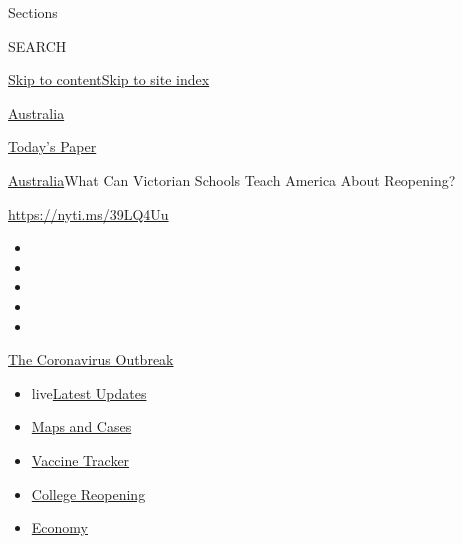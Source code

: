 Sections

SEARCH

\protect\hyperlink{site-content}{Skip to
content}\protect\hyperlink{site-index}{Skip to site index}

\href{https://www.nytimes.com/section/world/australia}{Australia}

\href{https://myaccount.nytimes.com/auth/login?response_type=cookie\&client_id=vi}{}

\href{https://www.nytimes.com/section/todayspaper}{Today's Paper}

\href{/section/world/australia}{Australia}\textbar{}What Can Victorian
Schools Teach America About Reopening?

\url{https://nyti.ms/39LQ4Uu}

\begin{itemize}
\item
\item
\item
\item
\item
\end{itemize}

\href{https://www.nytimes.com/news-event/coronavirus?action=click\&pgtype=Article\&state=default\&region=TOP_BANNER\&context=storylines_menu}{The
Coronavirus Outbreak}

\begin{itemize}
\tightlist
\item
  live\href{https://www.nytimes.com/2020/08/04/world/coronavirus-cases.html?action=click\&pgtype=Article\&state=default\&region=TOP_BANNER\&context=storylines_menu}{Latest
  Updates}
\item
  \href{https://www.nytimes.com/interactive/2020/us/coronavirus-us-cases.html?action=click\&pgtype=Article\&state=default\&region=TOP_BANNER\&context=storylines_menu}{Maps
  and Cases}
\item
  \href{https://www.nytimes.com/interactive/2020/science/coronavirus-vaccine-tracker.html?action=click\&pgtype=Article\&state=default\&region=TOP_BANNER\&context=storylines_menu}{Vaccine
  Tracker}
\item
  \href{https://www.nytimes.com/2020/08/02/us/covid-college-reopening.html?action=click\&pgtype=Article\&state=default\&region=TOP_BANNER\&context=storylines_menu}{College
  Reopening}
\item
  \href{https://www.nytimes.com/live/2020/08/04/business/stock-market-today-coronavirus?action=click\&pgtype=Article\&state=default\&region=TOP_BANNER\&context=storylines_menu}{Economy}
\end{itemize}

